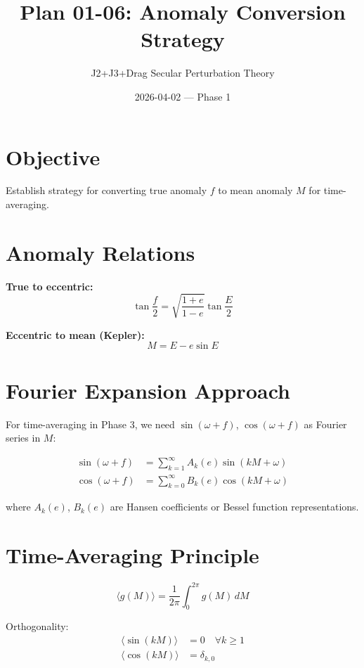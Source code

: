 \documentclass[11pt]{article}
\title{Plan 01-06: Anomaly Conversion Strategy}
\author{J2+J3+Drag Secular Perturbation Theory}
\date{2026-04-02 — Phase 1}
\begin{document}
\maketitle

\section{Objective}
Establish strategy for converting true anomaly $f$ to mean anomaly $M$ for time-averaging.

\section{Anomaly Relations}

\textbf{True to eccentric:}
\begin{equation}
\tan\frac{f}{2} = \sqrt{\frac{1+e}{1-e}} \tan\frac{E}{2}
\end{equation}

\textbf{Eccentric to mean (Kepler):}
\begin{equation}
M = E - e\sin E
\end{equation}

\section{Fourier Expansion Approach}

For time-averaging in Phase 3, we need $\sin(\omega+f)$, $\cos(\omega+f)$ as Fourier series in $M$:

\begin{align}
\sin(\omega + f) &= \sum_{k=1}^{\infty} A_k(e) \sin(k M + \omega)\\
\cos(\omega + f) &= \sum_{k=0}^{\infty} B_k(e) \cos(k M + \omega)
\end{align}

where $A_k(e)$, $B_k(e)$ are Hansen coefficients or Bessel function representations.

\section{Time-Averaging Principle}

\begin{equation}
\langle g(M) \rangle = \frac{1}{2\pi}\int_0^{2\pi} g(M)\, dM
\end{equation}

Orthogonality:
\begin{align}
\langle \sin(kM) \rangle &= 0 \quad \forall k \geq 1\\
\langle \cos(kM) \rangle &= \delta_{k,0}
\end{align}
\end{document}
